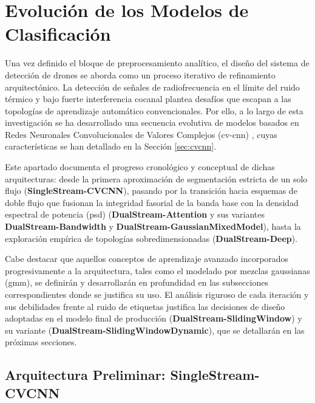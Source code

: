 \section{Evolución de los Modelos de Clasificación}
\label{sec:evolucion_modelos}

Una vez definido el bloque de preprocesamiento analítico, el diseño del sistema de detección de drones se aborda como un proceso iterativo de refinamiento arquitectónico. La detección de señales de radiofrecuencia en el límite del ruido térmico y bajo fuerte interferencia cocanal plantea desafíos que escapan a las topologías de aprendizaje automático convencionales. Por ello, a lo largo de esta investigación se ha desarrollado una secuencia evolutiva de modelos basados en Redes Neuronales Convolucionales de Valores Complejos (\gls{cv-cnn}) \cite{bassey_survey_2021}, cuyas características se han detallado en la Sección \ref{sec:cvcnn}. 

Este apartado documenta el progreso cronológico y conceptual de dichas arquitecturas: desde la primera aproximación de segmentación estricta de un solo flujo (\textbf{SingleStream-CVCNN}), pasando por la transición hacia esquemas de doble flujo que fusionan la integridad fasorial de la banda base con la densidad espectral de potencia (\gls{psd}) (\textbf{DualStream-Attention} y sus variantes \textbf{DualStream-Bandwidth} y \textbf{DualStream-GaussianMixedModel}), hasta la exploración empírica de topologías sobredimensionadas (\textbf{DualStream-Deep}).

Cabe destacar que aquellos conceptos de aprendizaje avanzado incorporados progresivamente a la arquitectura, tales como el modelado por mezclas gaussianas (\gls{gmm}), se definirán y desarrollarán en profundidad en las subsecciones correspondientes donde se justifica su uso. El análisis riguroso de cada iteración y sus debilidades frente al ruido de etiquetas justifica las decisiones de diseño adoptadas en el modelo final de producción (\textbf{DualStream-SlidingWindow}) y su variante (\textbf{DualStream-SlidingWindowDynamic}), que se detallarán en las próximas secciones.

\subsection{Arquitectura Preliminar: SingleStream-CVCNN}
\label{subsec:singlestream_cvcnn}

